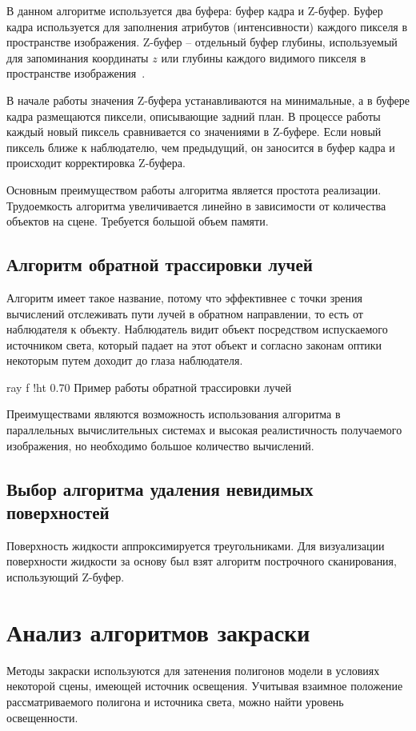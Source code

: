 В данном алгоритме используется два буфера: буфер кадра и Z-буфер. 
Буфер кадра используется для заполнения атрибутов (интенсивности) каждого пикселя в пространстве изображения.  
Z-буфер – отдельный буфер глубины, используемый для запоминания координаты $z$ или глубины каждого видимого пикселя 
в пространстве изображения~\cite{ROB}.

В начале работы значения Z-буфера устанавливаются на минимальные, а в буфере кадра размещаются пиксели, описывающие задний план. 
В процессе работы каждый новый пиксель сравнивается со значениями в Z-буфере. 
Если новый пиксель ближе к наблюдателю, чем предыдущий, он заносится в буфер кадра и происходит корректировка Z-буфера. 

Основным преимуществом работы алгоритма является простота реализации. 
Трудоемкость алгоритма увеличивается линейно в зависимости от количества объектов на сцене. 
Требуется большой объем памяти.

\subsection{Алгоритм обратной трассировки лучей}

Алгоритм имеет такое название, потому что эффективнее с точки зрения вычислений отслеживать пути лучей в обратном направлении, то есть от наблюдателя к объекту. Наблюдатель видит объект посредством испускаемого источником света, который падает на этот объект и согласно законам оптики некоторым путем доходит до глаза наблюдателя. 

    {ray}
    {f}
    {!ht}
    {0.70\textwidth}
    {Пример работы обратной трассировки лучей}

Преимуществами являются возможность использования алгоритма в параллельных вычислительных системах и высокая реалистичность получаемого изображения, но необходимо большое количество вычислений.

\subsection{Выбор алгоритма удаления невидимых поверхностей}
Поверхность жидкости аппроксимируется треугольниками. 
Для визуализации поверхности жидкости за основу был взят 
алгоритм построчного сканирования, использующий Z-буфер. 

\newpage 

\section{Анализ алгоритмов закраски}
Методы закраски используются для затенения полигонов модели в условиях некоторой сцены,
имеющей источник освещения. 
Учитывая взаимное положение рассматриваемого полигона и источника света, можно найти уровень освещенности. 

